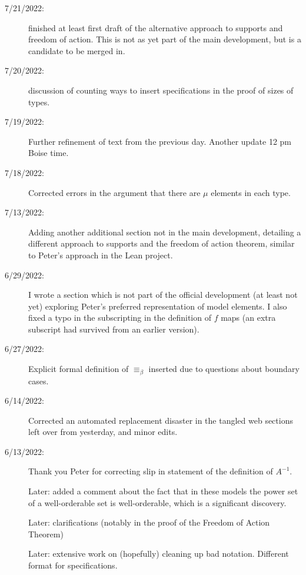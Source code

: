 \documentclass[112pt]{article}
\begin{document}
\begin{description}

\item[7/21/2022:]  finished at least first draft of the alternative approach to supports and freedom of action.  This is not as yet part of the main development, but is a candidate to be merged in.

\item[7/20/2022:]  discussion of counting ways to insert specifications in the proof of sizes of types.

\item[7/19/2022:]  Further refinement of text from the previous day.  Another update 12 pm Boise time.

\item[7/18/2022:]  Corrected errors in the argument that there are $\mu$ elements in each type.

\item[7/13/2022:]  Adding another additional section not in the main development, detailing a different approach to supports and the freedom of action theorem, similar to Peter's approach in the Lean project.

\item[6/29/2022:]  I wrote a section which is not part of the official development (at least not yet) exploring Peter's preferred representation of model elements.  I also fixed a typo in the subscripting in the definition of $f$ maps (an extra subscript had survived from an earlier version).

\item[6/27/2022:]  Explicit formal definition of $\equiv_\beta$ inserted due to questions about boundary cases.

\item[6/14/2022:]  Corrected an automated replacement disaster in the tangled web sections left over from yesterday, and minor edits.

\item[6/13/2022:]  Thank you Peter for correcting slip in statement of the definition of $A^{-1}$.

Later:  added a comment about the fact that in these models the power set of a well-orderable set is well-orderable, which is a significant discovery.

Later:  clarifications (notably in the proof of the Freedom of Action Theorem) 

Later:  extensive work on (hopefully) cleaning up bad notation.  Different format for specifications.


\end{description}
\end{document}

